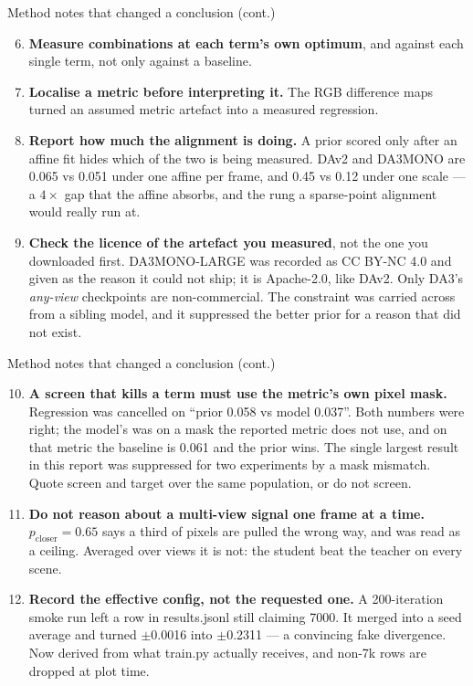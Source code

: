 \documentclass[aspectratio=169,9pt]{beamer}
\makeatletter
\newcommand{\dn}[1]{\textcolor{bad}{#1}}
\newcommand{\code}[1]{{\ttfamily\fontsize{0.92\f@size}{\f@baselineskip}\selectfont #1}}
\makeatother
\begin{document}
\begin{frame}{Method notes that changed a conclusion (cont.)}
  \begin{enumerate}
    \setcounter{enumi}{5}
    \item \textbf{Measure combinations at each term's own optimum}, and against each single
          term, not only against a baseline.
    \item \textbf{Localise a metric before interpreting it.} The RGB difference maps turned an
          assumed metric artefact into a measured regression.
    \item \textbf{Report how much the alignment is doing.} A prior scored only after an affine
          fit hides which of the two is being measured. DAv2 and DA3MONO are 0.065 vs 0.051
          under one affine per frame, and 0.45 vs 0.12 under one scale --- a $4\times$ gap that
          the affine absorbs, and the rung a sparse-point alignment would really run at.
    \item \textbf{Check the licence of the artefact you measured}, not the one you downloaded
          first. \code{DA3MONO-LARGE} was recorded as CC BY-NC 4.0 and given as the reason it
          could not ship; it is Apache-2.0, like DAv2. Only DA3's \emph{any-view} checkpoints
          are non-commercial. The constraint was carried across from a sibling model, and it
          suppressed the better prior for a reason that did not exist.
  \end{enumerate}
\end{frame}

\begin{frame}{Method notes that changed a conclusion (cont.)}
  \begin{enumerate}
    \setcounter{enumi}{9}
    \item \textbf{A screen that kills a term must use the metric's own pixel mask.} Regression
          was cancelled on ``prior 0.058 vs model 0.037''. Both numbers were right; the model's
          was on a mask the reported metric does not use, and on that metric the baseline is
          0.061 and the prior wins. \dn{The single largest result in this report was suppressed
          for two experiments by a mask mismatch.} Quote screen and target over the same
          population, or do not screen.
    \item \textbf{Do not reason about a multi-view signal one frame at a time.}
          $p_{\text{closer}} = 0.65$ says a third of pixels are pulled the wrong way, and was
          read as a ceiling. Averaged over views it is not: the student beat the teacher on every
          scene.
    \item \textbf{Record the effective config, not the requested one.} A 200-iteration smoke run
          left a row in \code{results.jsonl} still claiming 7000. It merged into a seed average
          and turned $\pm$0.0016 into $\pm$0.2311 --- a convincing fake divergence. Now derived
          from what \code{train.py} actually receives, and non-7k rows are dropped at plot time.
  \end{enumerate}
\end{frame}
\end{document}
